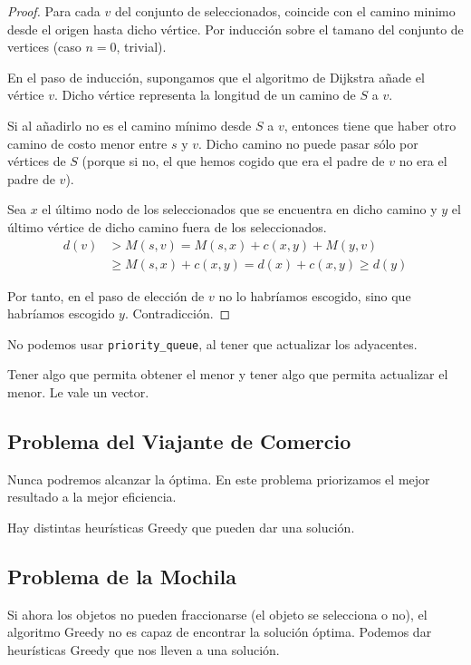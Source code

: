 \begin{proof}
    Para cada $v$ del conjunto de seleccionados, coincide con el camino minimo desde el origen hasta dicho vértice. Por inducción sobre el tamano del conjunto de vertices (caso $n=0$, trivial).

    En el paso de inducción, supongamos que el algoritmo de Dijkstra añade el vértice $v$. Dicho vértice representa la longitud de un camino de $S$ a $v$.

    Si al añadirlo no es el camino mínimo desde $S$ a $v$, entonces tiene que haber otro camino de costo menor entre $s$ y $v$. Dicho camino no puede pasar sólo por vértices de $S$ (porque si no, el que hemos cogido que era el padre de $v$ no era el padre de $v$).

    Sea $x$ el último nodo de los seleccionados que se encuentra en dicho camino y $y$ el último vértice de dicho camino fuera de los seleccionados.
    \begin{align*}
        d(v) &> M(s,v) = M(s,x) + c(x,y) + M(y, v)\\
             &\geq M(s,x) + c(x,y) = d(x) + c(x,y) \geq d(y)
    \end{align*}

    Por tanto, en el paso de elección de $v$ no lo habríamos escogido, sino que habríamos escogido $y$. Contradicción.
\end{proof}

\begin{observacion}
    No podemos usar \verb|priority_queue|, al tener que actualizar los adyacentes.

    Tener algo que permita obtener el menor y tener algo que permita actualizar el menor.
    Le vale un vector.
\end{observacion}

\subsection{Problema del Viajante de Comercio}
Nunca podremos alcanzar la óptima. En este problema priorizamos el mejor resultado a la mejor eficiencia.

Hay distintas heurísticas Greedy que pueden dar una solución.

\subsection{Problema de la Mochila}
Si ahora los objetos no pueden fraccionarse (el objeto se selecciona o no), el algoritmo Greedy no es capaz de encontrar la solución óptima. Podemos dar heurísticas Greedy que nos lleven a una solución.
